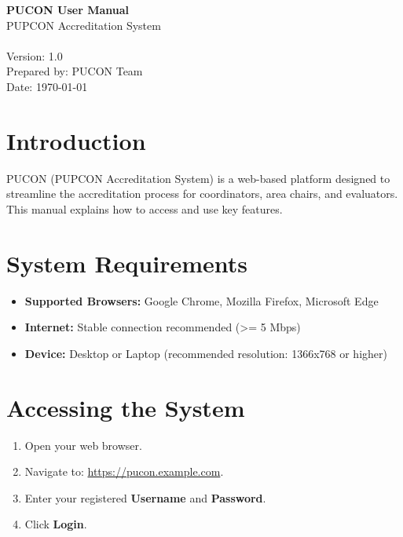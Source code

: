 \documentclass[11pt,a4paper]{article}
\begin{document}
\begin{titlepage}
    \centering
    {\Huge \bfseries PUCON User Manual \\[0.5em]}
    {\Large PUPCON Accreditation System \\}
    \\[2em]
    {\large Version: 1.0 \\
    Prepared by: PUCON Team \\
    Date: \today}
    \\
    \vfill
\end{titlepage}

\tableofcontents
\newpage


\section{Introduction}
PUCON (PUPCON Accreditation System) is a web-based platform designed to
streamline the accreditation process for coordinators, area chairs, and
evaluators. This manual explains how to access and use key features.

\section{System Requirements}
\begin{itemize}
    \item \textbf{Supported Browsers:} Google Chrome, Mozilla Firefox, Microsoft Edge
    \item \textbf{Internet:} Stable connection recommended (\textgreater= 5 Mbps)
    \item \textbf{Device:} Desktop or Laptop (recommended resolution: 1366x768 or higher)
\end{itemize}

\section{Accessing the System}
\begin{enumerate}
    \item Open your web browser.
    \item Navigate to: \url{https://pucon.example.com}.
    \item Enter your registered \textbf{Username} and \textbf{Password}.
    \item Click \textbf{Login}.
\end{enumerate}
\end{document}

